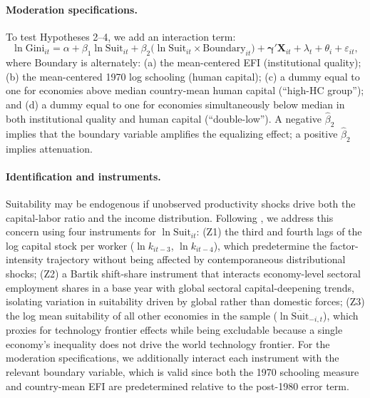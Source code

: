 \documentclass[12pt]{article}
\newcommand{\suit}{\mathrm{Suit}}
\newcommand{\gini}{\mathrm{Gini}}
\begin{document}
\paragraph{Moderation specifications.}
To test Hypotheses 2--4, we add an interaction term:
\begin{equation}
  \ln \gini_{it}
    = \alpha + \beta_1 \ln \suit_{it}
    + \beta_2 \bigl(\ln \suit_{it} \times \mathrm{Boundary}_{it}\bigr)
    + \boldsymbol{\gamma}' \mathbf{X}_{it}
    + \lambda_t + \theta_i + \varepsilon_{it},
  \label{eq:moderation}
\end{equation}
where $\mathrm{Boundary}$ is alternately:
(a) the mean-centered EFI (institutional quality);
(b) the mean-centered 1970 log schooling (human capital);
(c) a dummy equal to one for economies above median
    country-mean human capital (``high-HC group''); and
(d) a dummy equal to one for economies simultaneously below
    median in both institutional quality and human capital
    (``double-low'').
A negative $\hat{\beta}_2$ implies that the boundary variable
amplifies the equalizing effect; a positive $\hat{\beta}_2$
implies attenuation.

\paragraph{Identification and instruments.}
Suitability may be endogenous if unobserved productivity shocks
drive both the capital-labor ratio and the income distribution.
Following \citet{li2026prosperity}, we address this concern using
four instruments for $\ln \suit_{it}$:
(Z1) the third and fourth lags of the log capital stock per worker
  ($\ln k_{it-3}$, $\ln k_{it-4}$), which predetermine the
  factor-intensity trajectory without being affected by
  contemporaneous distributional shocks;
(Z2) a Bartik shift-share instrument that interacts economy-level
  sectoral employment shares in a base year with global sectoral
  capital-deepening trends, isolating variation in suitability
  driven by global rather than domestic forces;
(Z3) the log mean suitability of all other economies in the sample
  ($\ln \overline{\suit}_{-i,t}$), which proxies for technology
  frontier effects while being excludable because a single
  economy's inequality does not drive the world technology frontier.
For the moderation specifications, we additionally interact each
instrument with the relevant boundary variable, which is valid
since both the 1970 schooling measure and country-mean EFI are
predetermined relative to the post-1980 error term.
\end{document}
